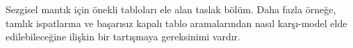 \documentclass[../../../include/open-logic-chapter]{subfiles}
\begin{document}

\begin{editorial}
  Sezgisel mantık için önekli tabloları ele alan taslak bölüm. Daha fazla
  örneğe, tamlık ispatlarına ve başarısız kapalı tablo aramalarından nasıl
  karşı-model elde edilebileceğine ilişkin bir tartışmaya gereksinimi vardır.
\end{editorial}


\OLEndChapterHook
\end{document}
